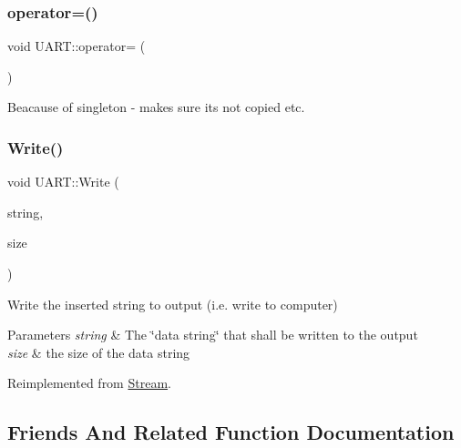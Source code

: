 \subsubsection{\texorpdfstring{operator=()}{operator=()}}
{\footnotesize\ttfamily void U\+A\+R\+T\+::operator= (\begin{DoxyParamCaption}\item[{const \hyperlink{class_u_a_r_t}{U\+A\+RT} \&}]{ }\end{DoxyParamCaption})\hspace{0.3cm}{\ttfamily [delete]}}

Beacause of singleton -\/ makes sure its not copied etc. \hypertarget{class_u_a_r_t_a8bb77ca27b4e17d608d2743313625ac4}{}\label{class_u_a_r_t_a8bb77ca27b4e17d608d2743313625ac4} 
\subsubsection{\texorpdfstring{Write()}{Write()}}
{\footnotesize\ttfamily void U\+A\+R\+T\+::\+Write (\begin{DoxyParamCaption}\item[{uint8\+\_\+t $\ast$}]{string,  }\item[{uint16\+\_\+t}]{size }\end{DoxyParamCaption})\hspace{0.3cm}{\ttfamily [virtual]}}

Write the inserted string to output (i.\+e. write to computer) 
\begin{DoxyParams}{Parameters}
{\em string} & The \char`\"{}data string\char`\"{} that shall be written to the output \\
\hline
{\em size} & the size of the data string \\
\hline
\end{DoxyParams}


Reimplemented from \hyperlink{class_stream_a508be3423e4d99ab2757275fb723002a}{Stream}.



\subsection{Friends And Related Function Documentation}
\hypertarget{class_u_a_r_t_accc13d37cd82c841e387e1d5cf4d9a94}{}\label{class_u_a_r_t_accc13d37cd82c841e387e1d5cf4d9a94} 
